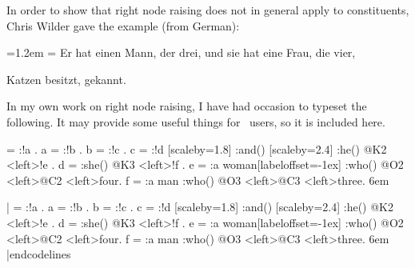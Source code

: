 
\example

In order to show that right node raising does not in general
apply to constituents, Chris Wilder gave the example (from
German):

\medskip
{\leftskip=1.2em \rightskip=\leftskip
Er hat einen Mann, der drei, und sie hat eine Frau,
   die vier,\par \hfill Katzen besitzt, gekannt.\medskip}

In my own work on right node raising, I have had occasion to
typeset the following.  It may provide some useful things for
\jTree\ users, so it is included here.
\bigskip

\hfil
\jtree[dirA=(1:-1),nodesepA=0,nodesepB=.8ex,style=arrows2]
\! = :!a {}.
\!a = :!b {}.
\!b = :!c {}.
\!c =
   :\jtlong !d [scaleby=1.8]
   :{and}() [scaleby=2.4]
   :{he}() @K2
   <left>\jtjot !e .
\!d =
   :{she}() @K3
   <left>\jtjot !f .
\!e =
   :{a woman}[labeloffset=-1ex]
   :{who}() @O2
   <left>@C2
   <left>{four}.
\!f =
   :{a man}
   :{who}() @O3
   <left>@C3
   <left>{three}.
\endjtree\kern6em

\codelines|
\jtree[dirA=(1:-1),nodesepA=0,nodesepB=.8ex,arrows=->,
   arrowlength=3.6,arrowsize=2pt,arrowinset=.4]
\! = :!a {}.
\!a = :!b {}.
\!b = :!c {}.
\!c =
   :\jtlong !d [scaleby=1.8]
   :{and}() [scaleby=2.4]
   :{he}() @K2
   <left>\jtjot !e .
\!d =
   :{she}() @K3
   <left>\jtjot !f .
\!e =
   :{a woman}[labeloffset=-1ex]
   :{who}() @O2
   <left>@C2
   <left>{four}.
\!f =
   :{a man}
   :{who}() @O3
   <left>@C3
   <left>{three}.
\endjtree\kern6em
|endcodelines
